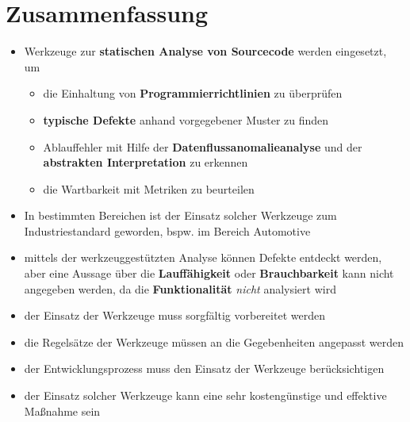 \section{Zusammenfassung}

\begin{itemize}
    \item Werkzeuge zur \textbf{statischen Analyse von Sourcecode} werden eingesetzt, um
    \begin{itemize}
        \item die Einhaltung von \textbf{Programmierrichtlinien} zu überprüfen
        \item \textbf{typische Defekte} anhand vorgegebener Muster zu finden
        \item Ablauffehler mit Hilfe der \textbf{Datenflussanomalieanalyse} und der \textbf{abstrakten Interpretation} zu erkennen
        \item die Wartbarkeit mit Metriken zu beurteilen
    \end{itemize}
    \item In bestimmten Bereichen ist der Einsatz solcher Werkzeuge zum Industriestandard geworden, bspw. im Bereich Automotive
    \item mittels der werkzeuggestützten Analyse können Defekte entdeckt werden, aber eine Aussage über die \textbf{Lauffähigkeit} oder \textbf{Brauchbarkeit} kann nicht angegeben werden, da die \textbf{Funktionalität} \textit{nicht} analysiert wird
    \item der Einsatz der Werkzeuge muss sorgfältig vorbereitet werden
    \item die Regelsätze der Werkzeuge müssen an die Gegebenheiten angepasst werden
    \item der Entwicklungsprozess muss den Einsatz der Werkzeuge berücksichtigen
    \item der Einsatz solcher Werkzeuge kann eine sehr kostengünstige und effektive Maßnahme sein
\end{itemize}